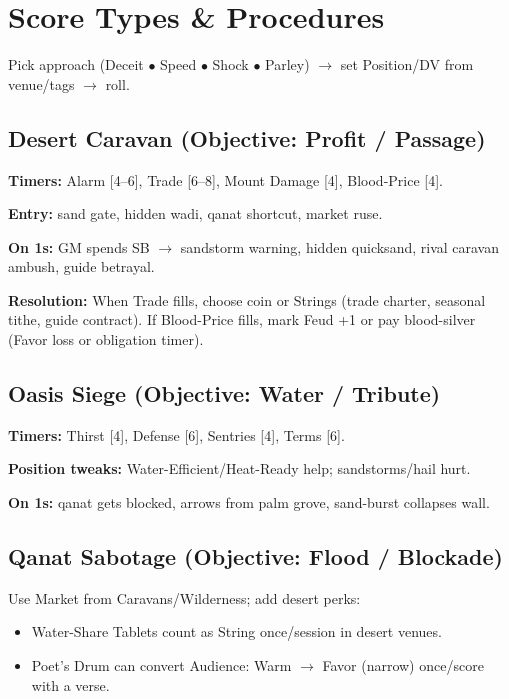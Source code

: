 \documentclass[11pt]{article}
\begin{document}
\section{Score Types \& Procedures}

Pick approach (Deceit $\bullet$ Speed $\bullet$ Shock $\bullet$ Parley) $\rightarrow$ set Position/DV from venue/tags $\rightarrow$ roll.

\subsection{Desert Caravan (Objective: Profit / Passage)}

\textbf{Timers:} Alarm [4--6], Trade [6--8], Mount Damage [4], Blood-Price [4].

\textbf{Entry:} sand gate, hidden wadi, qanat shortcut, market ruse.

\textbf{On 1s:} GM spends SB $\rightarrow$ sandstorm warning, hidden quicksand, rival caravan ambush, guide betrayal.

\textbf{Resolution:} When Trade fills, choose coin or Strings (trade charter, seasonal tithe, guide contract). If Blood-Price fills, mark Feud +1 or pay blood-silver (Favor loss or obligation timer).

\subsection{Oasis Siege (Objective: Water / Tribute)}

\textbf{Timers:} Thirst [4], Defense [6], Sentries [4], Terms [6].

\textbf{Position tweaks:} Water-Efficient/Heat-Ready help; sandstorms/hail hurt.

\textbf{On 1s:} qanat gets blocked, arrows from palm grove, sand-burst collapses wall.

\subsection{Qanat Sabotage (Objective: Flood / Blockade)}

Use Market from Caravans/Wilderness; add desert perks:
\begin{itemize}
\item Water-Share Tablets count as String once/session in desert venues.
\item Poet's Drum can convert Audience: Warm $\rightarrow$ Favor (narrow) once/score with a verse.
\end{itemize}
\end{document}
